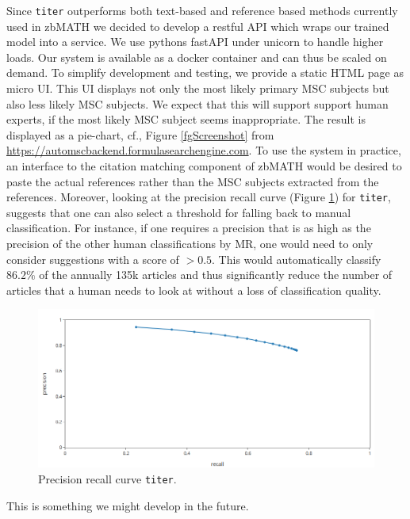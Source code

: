 Since \texttt{titer} outperforms both text-based and reference based methods currently used in zbMATH we decided to develop a restful API which wraps our trained model into a service.
We use pythons fastAPI under unicorn to handle higher loads.
Our system is available as a docker container and can thus be scaled on demand.
To simplify development and testing, we provide a static HTML page as micro UI.
This UI displays not only the most likely primary MSC subjects but also less likely MSC subjects.
We expect that this will support support human experts, if the most likely MSC subject seems inappropriate.
The result is displayed as a pie-chart, cf., Figure \ref{fgScreenshot} from
\url{https://automscbackend.formulasearchengine.com}.
To use the system in practice, an interface to the citation matching component of zbMATH would be desired to paste the actual references rather than the MSC subjects extracted from the references.
Moreover, looking at the precision recall curve (Figure \ref{fgPR}) for \texttt{titer}, suggests that one can also select a threshold for falling back to manual classification.
For instance, if one requires a precision that is as high as the precision of the other human classifications by MR, one would need to only consider suggestions with a score of $>0.5$. 
This would automatically classify $86.2\%$ of the annually 135k articles and thus significantly reduce the number of articles that a human needs to look at without a loss of classification quality.

\begin{figure}[t]
  \centering
  \includegraphics[width=.7\textwidth]{prcurve.png}
  \caption{Precision recall curve \texttt{titer}.}
  \label{fgPR}
\end{figure}
This is something we might develop in the future.


